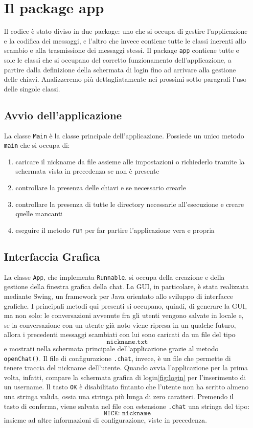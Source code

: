 \section{Il package app}
Il codice è stato diviso in due package: uno che si occupa di gestire l'applicazione
e la codifica dei messaggi, e l'altro che invece contiene tutte le classi inerenti
allo scambio e alla trasmissione dei messaggi stessi.
Il package \texttt{app} contiene tutte e sole le classi che si occupano del corretto
funzionamento dell'applicazione, a partire dalla definizione della schermata di login
fino ad arrivare alla gestione delle chiavi. Analizzeremo più dettagliatamente
nei prossimi sotto-paragrafi l'uso delle singole classi.

\subsection{Avvio dell'applicazione}
La classe \texttt{Main} è la classe principale dell'applicazione.
Possiede un unico metodo \texttt{main} che
si occupa di:
\begin{enumerate}
	\item caricare il nickname da file assieme alle impostazioni o richiederlo tramite la
	schermata vista in precedenza se non è presente
	\item controllare la presenza delle chiavi e se necessario crearle
	\item controllare la presenza di tutte le directory necessarie all'esecuzione e creare 
	quelle mancanti
	\item eseguire il metodo \texttt{run} per far partire l'applicazione vera e propria
\end{enumerate}

\subsection{Interfaccia Grafica}
La classe \texttt{App}, che implementa \texttt{Runnable}, si occupa della
creazione e della gestione della finestra grafica della chat. La GUI,
in particolare, è stata realizzata mediante Swing, un framework per Java
orientato allo sviluppo di interfacce grafiche.
I principali metodi qui presenti si occupano, quindi, di generare la GUI, ma non
solo: le conversazioni avvenute fra gli utenti vengono salvate in locale e, se
la conversazione con un utente già noto viene ripresa in un qualche futuro, allora
i precedenti messaggi scambiati con lui sono caricati da un file del tipo
$$ \texttt{nickname.txt} $$ 
e mostrati nella schermata principale dell'applicazione grazie al metodo \texttt{openChat()}.
Il file di configurazione \texttt{.chat}, invece, è un file che permette di
tenere traccia del nickname dell'utente. Quando avvia l'applicazione per la
prima volta, infatti, compare la schermata grafica di login\ref{fig:login} per l'inserimento
di un username. Il tasto \texttt{OK} è disabilitato fintanto che l'utente non ha
scritto almeno una stringa valida, ossia una stringa più lunga di zero caratteri.
Premendo il tasto di conferma, viene salvata nel file con estensione \texttt{.chat}
una stringa del tipo:
$$ \texttt{NICK: nickname} $$
insieme ad altre informazioni di configurazione, viste in precedenza.

